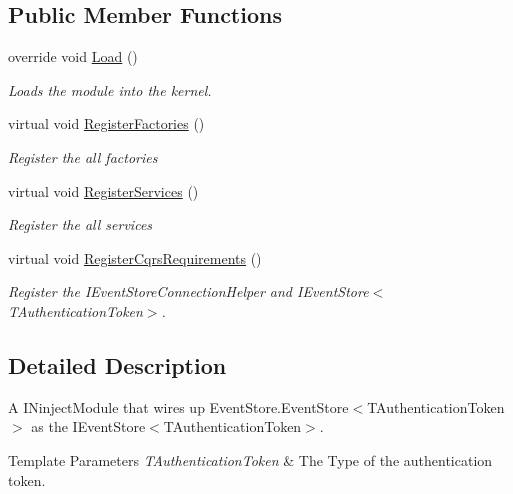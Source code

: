 \subsection*{Public Member Functions}
\begin{DoxyCompactItemize}
\item 
override void \hyperlink{classCqrs_1_1Ninject_1_1Configuration_1_1EventStoreModule_a90454d879b35a9d8954944e26c5afca9_a90454d879b35a9d8954944e26c5afca9}{Load} ()
\begin{DoxyCompactList}\small\item\em Loads the module into the kernel. \end{DoxyCompactList}\item 
virtual void \hyperlink{classCqrs_1_1Ninject_1_1Configuration_1_1EventStoreModule_a01ffbc5d28ee88168fc9058fcde6fff0_a01ffbc5d28ee88168fc9058fcde6fff0}{Register\+Factories} ()
\begin{DoxyCompactList}\small\item\em Register the all factories \end{DoxyCompactList}\item 
virtual void \hyperlink{classCqrs_1_1Ninject_1_1Configuration_1_1EventStoreModule_a72c71c7ccd12ca4ef434e3eea4dce7db_a72c71c7ccd12ca4ef434e3eea4dce7db}{Register\+Services} ()
\begin{DoxyCompactList}\small\item\em Register the all services \end{DoxyCompactList}\item 
virtual void \hyperlink{classCqrs_1_1Ninject_1_1Configuration_1_1EventStoreModule_a37ca0381038742667e7253f94e80e4b8_a37ca0381038742667e7253f94e80e4b8}{Register\+Cqrs\+Requirements} ()
\begin{DoxyCompactList}\small\item\em Register the I\+Event\+Store\+Connection\+Helper and I\+Event\+Store$<$\+T\+Authentication\+Token$>$. \end{DoxyCompactList}\end{DoxyCompactItemize}


\subsection{Detailed Description}
A I\+Ninject\+Module that wires up Event\+Store.\+Event\+Store$<$\+T\+Authentication\+Token$>$ as the I\+Event\+Store$<$\+T\+Authentication\+Token$>$. 


\begin{DoxyTemplParams}{Template Parameters}
{\em T\+Authentication\+Token} & The Type of the authentication token.\\
\hline
\end{DoxyTemplParams}


